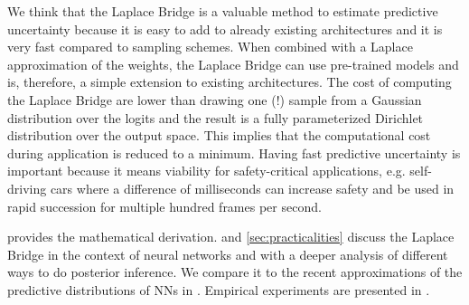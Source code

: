 We think that the Laplace Bridge is a valuable method to estimate predictive uncertainty because it is easy to add to already existing architectures and it is very fast compared to sampling schemes. When combined with a Laplace approximation of the weights, the Laplace Bridge can use pre-trained models and is, therefore, a simple extension to existing architectures. The cost of computing the Laplace Bridge are lower than drawing one (!) sample from a Gaussian distribution over the logits and the result is a fully parameterized Dirichlet distribution over the output space. This implies that the computational cost during application is reduced to a minimum. Having fast predictive uncertainty is important because it means viability for safety-critical applications, e.g. self-driving cars where a difference of milliseconds can increase safety and be used in rapid succession for multiple hundred frames per second. 

 provides the mathematical derivation.  and \ref{sec:practicalities} discuss the Laplace Bridge in the context of neural networks and with a deeper analysis of different ways to do posterior inference. We compare it to the recent approximations of the predictive distributions of NNs in . Empirical experiments are presented in .
